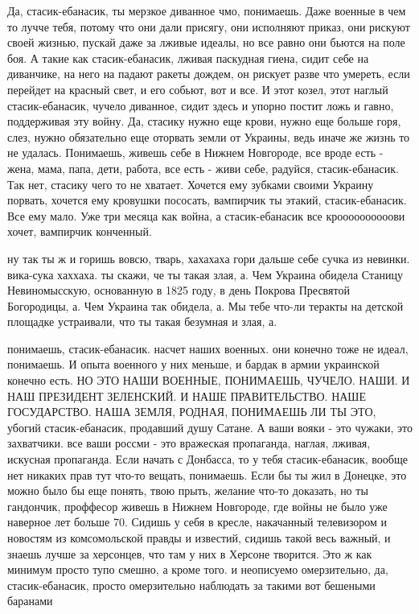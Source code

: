 Да, стасик-ебанасик, ты мерзкое диванное чмо, понимаешь. Даже военные в чем то
лучче тебя, потому что они дали присягу, они исполняют приказ, они рискуют
своей жизнью, пускай даже за лживые идеалы, но все равно они бьются на поле
боя. А такие как стасик-ебанасик, лживая паскудная гиена, сидит себе на
диванчике, на него на падают ракеты дождем, он рискует разве что умереть, если
перейдет на красный свет, и его собьют, вот и все. И этот козел, этот наглый
стасик-ебанасик, чучело диванное, сидит здесь и упорно постит ложь и гавно,
поддерживая эту войну. Да, стасику нужно еще крови, нужно еще больше горя,
слез, нужно обязательно еще оторвать земли от Украины, ведь иначе же жизнь то
не удалась. Понимаешь, живешь себе в Нижнем Новгороде, все вроде есть - жена,
мама, папа, дети, работа, все есть - живи себе, радуйся, стасик-ебанасик. Так
нет, стасику чего то не хватает. Хочется ему зубками своими Украину порвать,
хочется ему кровушки пососать, вампирчик ты этакий, стасик-ебанасик. Все ему
мало. Уже три месяца как война, а стасик-ебанасик все кроооооооооови хочет,
вампирчик конченный.

ну так ты ж и горишь вовсю, тварь, хахахаха гори дальше себе сучка из невинки.
вика-сука хаххаха. ты скажи, че ты такая злая, а. Чем Украина обидела Станицу
Невиномысскую, основанную в 1825 году, в день Покрова Пресвятой Богородицы, а.
Чем Украина так обидела, а. Мы тебе что-ли теракты на детской площадке
устраивали, что ты такая безумная и злая, а.

понимаешь, стасик-ебанасик. насчет наших военных. они конечно тоже не идеал,
понимаешь. И опыта военного у них меньше, и бардак в армии украинской конечно
есть. НО ЭТО НАШИ ВОЕННЫЕ, ПОНИМАЕШЬ, ЧУЧЕЛО. НАШИ. И НАШ ПРЕЗИДЕНТ ЗЕЛЕНСКИЙ.
И НАШЕ ПРАВИТЕЛЬСТВО. НАШЕ ГОСУДАРСТВО. НАША ЗЕМЛЯ, РОДНАЯ, ПОНИМАЕШЬ ЛИ ТЫ
ЭТО, убогий стасик-ебанасик, продавший душу Сатане. А ваши вояки - это чужаки,
это захватчики. все ваши россми - это вражеская пропаганда, наглая, лживая,
искусная пропаганда. Если начать с Донбасса, то у тебя стасик-ебанасик, вообще
нет никаких прав тут что-то вещать, понимаешь. Если бы ты жил в Донецке, это
можно было бы еще понять, твою прыть, желание что-то доказать, но ты гандончик,
проффесор живешь в Нижнем Новгороде, где войны не было уже наверное лет больше
70. Сидишь у себя в кресле, накачанный телевизором и новостям из комсомольской
правды и известий, сидишь такой весь важный, и знаешь лучше за херсонцев, что
там у них в Херсоне творится. Это ж как минимум просто тупо смешно, а кроме
того. и неописуемо омерзительно, да, стасик-ебанасик, просто омерзительно
наблюдать за такими вот бешеными баранами

